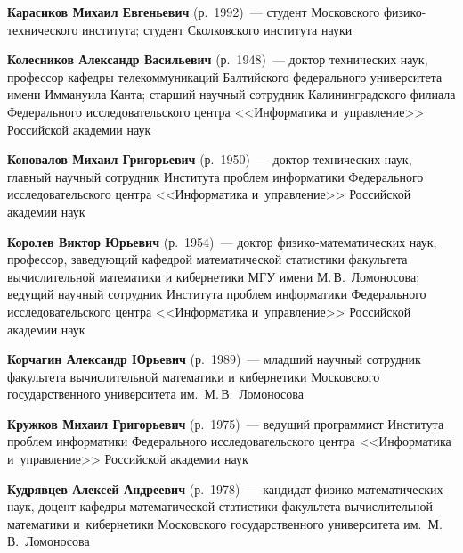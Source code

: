 \begin{multicols}{2}
\noindent
\textbf{Карасиков Михаил Евгеньевич} (р.\ 1992)~---
студент Московского фи\-зи\-ко-тех\-ни\-че\-ско\-го 
института; студент Сколковского института науки

\vspace*{3pt}

\noindent
\textbf{Колесников Александр Васильевич} (р.\ 1948)~---
доктор технических наук, профессор кафедры телекоммуникаций Балтийского 
федерального университета имени Иммануила Канта; старший научный сотрудник 
Калининградского филиала Федерального исследовательского центра <<Информатика 
и~управ\-ле\-ние>> Российской академии наук

\vspace*{3pt}


\noindent
\textbf{Коновалов Михаил Григорьевич} (р.\ 1950)~--- доктор технических наук, 
главный научный сотрудник Института проб\-лем информатики Федерального 
исследовательского центра <<Информатика и~управ\-ле\-ние>> Российской академии наук



\noindent
\textbf{Королев Виктор Юрьевич} (р.\ 1954)~---
доктор фи\-зи\-ко-ма\-те\-ма\-ти\-че\-ских наук, профессор, 
заведующий кафедрой математической статистики факультета вычислительной 
математики и кибернетики МГУ имени М.\,В.~Ломоносова; ведущий научный сотрудник 
Института проб\-лем информатики Федерального исследовательского центра 
<<Информатика и~управ\-ле\-ние>> Российской академии наук

\vspace*{3pt}

\noindent
\textbf{Корчагин Александр Юрьевич} (р.\ 1989)~---
младший научный сотрудник 
факультета вычислительной математики и кибернетики Московского 
государственного университета им.\ М.\,В.~Ломоносова

\vspace*{3pt}

\noindent
\textbf{Кружков Михаил Григорьевич} (р.\ 1975)~--- 
ведущий программист Института проб\-лем информатики Федерального исследовательского 
центра <<Информатика и~управ\-ле\-ние>> Российской академии наук

\vspace*{3pt}

\noindent
\textbf{Кудрявцев Алексей Андреевич} (р.\ 1978)~--- кандидат 
фи\-зи\-ко-ма\-те\-ма\-ти\-че\-ских наук, доцент кафедры математической 
статистики факультета вычислительной математики и~кибернетики Московского 
государственного университета им.\ М.\,В.~Ломоносова


\end{multicols}
